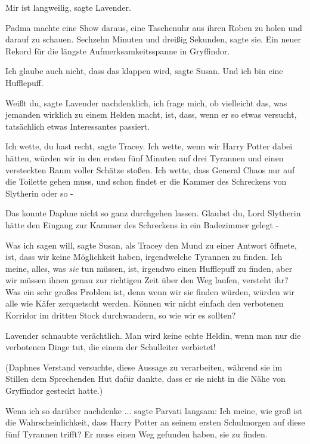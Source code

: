 \glqq{}Mir ist langweilig\grqq{}, sagte Lavender.

Padma machte eine Show daraus, eine Taschenuhr aus ihren Roben zu holen und
darauf zu schauen. \glqq{}Sechzehn Minuten und dreißig Sekunden\grqq{}, sagte
sie. \glqq{}Ein neuer Rekord für die längste Aufmerksamkeitsspanne in
Gryffindor.\grqq{}

\glqq{}Ich glaube auch nicht, dass das klappen wird\grqq{}, sagte Susan. \glqq{}
Und ich bin eine Hufflepuff.\grqq{}

\glqq{}Weißt du\grqq{}, sagte Lavender nachdenklich, \glqq{}ich frage mich, ob
vielleicht das, was jemanden wirklich zu einem Helden macht, ist, dass, wenn er
so etwas versucht, tatsächlich etwas Interessantes passiert.\grqq{}

\glqq{}Ich wette, du hast recht\grqq{}, sagte Tracey. \glqq{}Ich wette, wenn wir
Harry Potter dabei hätten, würden wir in den ersten fünf Minuten auf drei
Tyrannen und einen versteckten Raum voller Schätze stoßen. Ich wette, dass
General Chaos nur auf die Toilette gehen muss, und schon findet er die Kammer
des Schreckens von Slytherin oder so -\grqq{}

Das konnte Daphne nicht so ganz durchgehen lassen. \glqq{}Glaubst du, Lord
Slytherin hätte den Eingang zur Kammer des Schreckens in ein Badezimmer gelegt
-\grqq{}

\glqq{}Was ich sagen will\grqq{}, sagte Susan, als Tracey den Mund zu einer
Antwort öffnete, \glqq{}ist, dass wir keine Möglichkeit haben, irgendwelche
Tyrannen zu finden. Ich meine, alles, was \emph{sie} tun müssen, ist, irgendwo
einen Hufflepuff zu finden, aber wir müssen ihnen genau zur richtigen Zeit über
den Weg laufen, versteht ihr? Was ein sehr großes Problem ist, denn wenn wir sie
finden würden, würden wir alle wie Käfer zerquetscht werden. Können wir nicht
einfach den verbotenen Korridor im dritten Stock durchwandern, so wie wir es
sollten?\grqq{}

Lavender schnaubte verächtlich. \glqq{}Man wird keine echte Heldin, wenn man nur
die verbotenen Dinge tut, die einem der Schulleiter verbietet!\grqq{}

(Daphnes Verstand versuchte, diese Aussage zu verarbeiten, während sie im
Stillen dem Sprechenden Hut dafür dankte, dass er sie nicht in die Nähe von
Gryffindor gesteckt hatte.)

\glqq{}Wenn ich so darüber nachdenke ...\grqq{} sagte Parvati langsam: \glqq{}Ich
meine, wie groß ist die Wahrscheinlichkeit, dass Harry Potter an seinem ersten
Schulmorgen auf diese fünf Tyrannen trifft? Er muss einen Weg gefunden haben,
sie zu finden.\grqq{}

